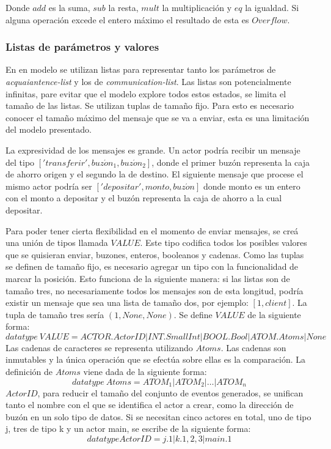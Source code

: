 Donde $add$ es la suma, $sub$ la resta, $mult$ la multiplicación y $eq$ la igualdad. Si alguna operación excede el entero máximo el resultado de esta es $Overflow$.

\subsubsection*{Listas de parámetros y valores}
En en modelo se utilizan listas para representar tanto los parámetros de \textit{acquaiantence-list} y los de \textit{communication-list}. Las listas son potencialmente infinitas, pare evitar que el modelo explore todos estos estados, se limita el tamaño de las listas. Se utilizan tuplas de tamaño fijo. Para esto es necesario conocer el tamaño máximo del mensaje que se va a enviar, esta es una limitación del modelo presentado.

La expresividad de los mensajes es grande. Un actor podría recibir un mensaje del tipo $['transferir', buz\acute{o}n_1, buz\acute{o}n_2]$, donde el primer buzón representa la caja de ahorro origen y el segundo la de destino. El siguiente mensaje que procese el mismo actor podría ser $['depositar', monto, buz\acute{o}n]$ donde monto es un entero con el monto a depositar y el buzón representa la caja de ahorro a la cual depositar. 

Para poder tener cierta flexibilidad en el momento de enviar mensajes, se creá una unión de tipos llamada $VALUE$. Este tipo codifica todos los posibles valores que se quisieran enviar, buzones, enteros, booleanos y cadenas. Como las tuplas se definen de tamaño fijo, es necesario agregar un tipo con la funcionalidad de marcar la posición. Esto funciona de la siguiente manera: si las listas son de tamaño tres, no necesariamente todos los mensajes son de esta longitud, podría existir un mensaje que sea una lista de tamaño dos, por ejemplo: $[1, client]$. La tupla de tamaño tres sería $(1, None, None)$. Se define $VALUE$ de la siguiente forma:
\[
  datatype\ VALUE = ACTOR.ActorID | INT.SmallInt | BOOL.Bool | ATOM.Atoms | None
\]
Las cadenas de caracteres se representa utilizando $Atoms$. Las cadenas son inmutables y la única operación que se efectúa sobre ellas es la comparación. La definición de $Atoms$ viene dada de la siguiente forma:
\[
  datatype\ Atoms = ATOM_1 | ATOM_2 | \ldots | ATOM_n
\]
$ActorID$, para reducir el tamaño del conjunto de eventos generados, se unifican tanto el nombre con el que se identifica el actor a crear, como la dirección de buzón en un solo tipo de datos. Si se necesitan cinco actores en total, uno de tipo j, tres de tipo k y un actor main, se escribe de la siguiente forma:
\[
  datatype ActorID = j.{1} | k.{1,2,3} | main.{1}
\]

